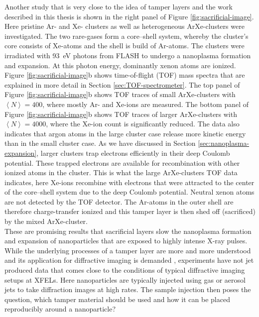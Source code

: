 %
Another study \citep{Hoener-2008-JPB} that is very close to the idea of tamper layers and the work described in this thesis is shown in the right panel of Figure \ref{fig:sacrificial-image}. Here pristine Ar- and Xe- clusters as well as heterogeneous ArXe-clusters were investigated. The two rare-gases form a core--shell system, whereby the cluster's core consists of Xe-atoms and the shell is build of Ar-atoms. The clusters were irradiated with \SI{93}{\electronvolt} photons from FLASH to undergo a nanoplasma formation and expansion. At this photon energy, dominantly xenon atoms are ionized. Figure \ref{fig:sacrificial-image}b shows time-of-flight (TOF) mass spectra that are explained in more detail in Section \ref{sec:TOF-spectrometer}. The top panel of Figure \ref{fig:sacrificial-image}b shows TOF traces of small ArXe-clusters with $\left\langle N\right\rangle = 400$, where mostly Ar- and Xe-ions are measured. The bottom panel of Figure \ref{fig:sacrificial-image}b shows TOF traces of larger ArXe-clusters with $\left\langle N\right\rangle = 4000$, where the Xe-ion count is significantly reduced. The data also indicates that argon atoms in the large cluster case release more kinetic energy than in the small cluster case.
As we have discussed in Section \ref{sec:nanoplasma-expansion}, larger clusters trap electrons efficiently in their deep Coulomb potential. These trapped electrons are available for recombination \cite{Hoener-2008-JPB,Ziaja-2011-PRA,Fennel-2010-RMP} with other ionized atoms in the cluster. This is what the large ArXe-clusters TOF data indicates, here Xe-ions recombine with electrons that were attracted to the center of the core--shell system due to the deep Coulomb potential. Neutral xenon atoms are not detected by the TOF detector. The Ar-atoms in the outer shell are therefore charge-transfer ionized and this tamper layer is then shed off (sacrificed) by the mixed ArXe-cluster.\\[1\baselineskip]
%
These are promising results that sacrificial layers slow the nanoplasma formation and expansion of nanoparticles that are exposed to highly intense X-ray pulses. While the underlying processes of a tamper layer are more and more understood and its application for diffractive imaging is demanded \cite{Aquila-2015-StrucDyn}, experiments have not jet produced data that comes close to the conditions of typical diffractive imaging setups at XFELs. Here nanoparticles are typically injected using gas or aerosol jets to take diffraction images at high rates. The sample injection then poses the question, which tamper material should be used and how it can be placed reproducibly around a nanoparticle?\\[1\baselineskip]
